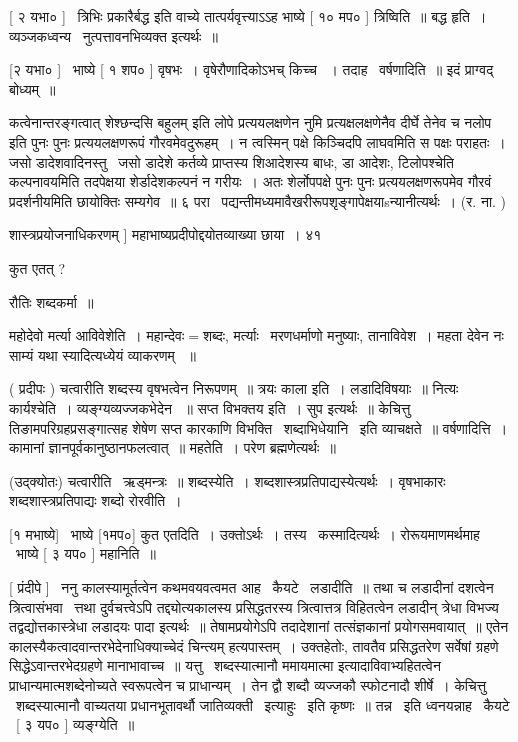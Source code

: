 \documentclass[11pt, openany]{book}
\begin{document}
 [ २ यभा० ] \textendash\ त्रिभिः प्रकारैर्बद्ध इति वाच्ये
तात्पर्यवृत्त्याऽऽह भाष्ये [ १० मप० ] त्रिष्विति~॥ बद्ध हृति~। 
व्यञ्जकध्वन्य \textendash\ नुत्पत्तावनभिव्यक्त इत्यर्थः~॥ 

 [२ यभा० ] \textendash\ भाष्ये [ १ शप० ] वृषभः~। वृषेरौणादिकोऽभच् किच्च
~। तदाह \textendash\ वर्षणादिति~॥ इदं प्राग्वद् बोध्यम्~॥ 



कत्वेनान्तरङ्गत्वात् {\qt शेश्छन्दसि बहुलम्} इति लोपे प्रत्ययलक्षणेन नुमि
प्रत्यक्षलक्षणेनैव दीर्घे तेनेव च नलोप इति पुनः पुनः प्रत्ययलक्षणरूपं
गौरवमेवदुरूहम्~। न त्वस्मिन् पक्षे किञ्चिदपि लाघवमिति स पक्षः पराहतः~। 
जसो डादेशवादिनस्तु \textendash\ जसो डादेशे कर्तव्ये प्राप्तस्य शिआदेशस्य बाधः, {\qt डा
आदेशः}, टिलोपश्चेति कल्पनावयमिति तदपेक्षया शेर्डादेशकल्पनं न गरीयः~। अतः
शेर्लोपपक्षे पुनः पुनः प्रत्ययलक्षणरूपमेव गौरवं प्रदर्शनीयमिति छायोक्तिः
सम्यगेव~॥ ६ परा \textendash\ पद्यन्तीमध्यमावैखरीरूपशृङ्गापेक्षयाsन्यानीत्यर्थः~। 
(र. ना. ) 

शास्त्रप्रयोजनाधिकरणम् ] महाभाष्यप्रदीपोद्दयोतव्याख्या छाया~। ४१ 



कुत एतत् ? 

रौतिः शब्दकर्मा~॥ 

महोदेवो मर्त्या आविवेशेति~। महान्देवः$=$शब्दः, मर्त्याः \textendash\ मरणधर्माणो
मनुष्याः, तानाविवेश~। महता देवेन नः साम्यं यथा स्यादित्यध्येयं व्याकरणम्
~॥ 

 ( प्रदीपः ) चत्वारीति शब्दस्य वृषभत्वेन निरूपणम्~॥ त्रयः काला
इति~। लडादिविषयाः~॥ नित्यः कार्यश्चेति~। व्यङ्ग्यव्यज्जकभेदेन
~॥ सप्त विभक्तय इति~। सुप इत्यर्थः~॥ केचित्तु
तिङामपरिग्रहप्रसङ्गात्सह शेषेण सप्त कारकाणि विभक्ति \textendash\ शब्दाभिधेयानि \textendash\ इति
व्याचक्षते~॥ वर्षणादित्ति~। कामानां ज्ञानपूर्वकानुष्ठानफलत्वात्~॥
महतेति~। परेण ब्रह्मणेत्यर्थः~॥ 

 (उद्क्योतः) चत्वारीति \textendash\ ऋड्मन्त्रः~॥ शब्दस्येति~। 
शब्दशास्त्रप्रतिपाद्यस्येत्यर्थः~। वृषभाकारः शब्दशास्त्रप्रतिपाद्यः
शब्दो रोरवीति~। 



 [१ मभाष्ये] \textendash\ भाष्ये [१मप०] कुत एतदिति~। उक्तोऽर्थः~। 
तस्य \textendash\ कस्मादित्यर्थः~। रोरूयमाणमर्थमाह \textendash\ भाष्ये [ ३ यप० ] महानिति~॥ 

 [ प्रंदीपे ] \textendash\ ननु कालस्यामूर्तत्वेन कथमवयवत्वमत आह \textendash\ कैयटे \textendash\ लडादीति~॥
तथा च लडादीनां दशत्वेन त्रित्वासंभवा \textendash\ त्तथा दुर्वचत्त्वेऽपि
तद्द्योत्यकालस्य प्रसिद्धतरस्य त्रित्वात्तत्र विहितत्वेन लडादीन् त्रेधा
विभज्य तद्वद्योत्तकास्त्रेधा लडादयः पादा इत्यर्थः~॥ तेषामप्रयोगेऽपि
तदादेशानां तत्संज्ञकानां प्रयोगसमवायात्~॥ एतेन
{\qt कालस्यैकत्वादवान्तरभेदेनाधिक्याच्चेदं चिन्त्यम्} हत्यपास्तम्~। 
उक्तहेतोः, तावतैव प्रसिद्धतरेण सर्वेषां ग्रहणे सिद्धेऽवान्तरभेदग्रहणे
मानाभावाच्च~॥ यत्तु \textendash\ शब्दस्यात्मानौ {\qt ममायमात्मा} इत्यादाविवाभ्यहितत्वेन
प्राधान्यमात्मशब्देनोच्यते स्वरूपत्वेन च प्राधान्यम्~। तेन द्वौ शब्दौ
व्यज्जकौ स्फोटनादौ शीर्षे~। केचित्तु \textendash\ शब्दस्यात्मानौ वाच्यतया
प्रधानभूतावर्थौ जातिव्यक्ती \textendash\ इत्याहुः \textendash\ इति कृष्णः~॥ तन्न \textendash\ इति
ध्वनयन्नाह \textendash\ कैयटे \textendash\ [ ३ यप० ] व्यङ्ग्येति~॥ 
\end{document}
